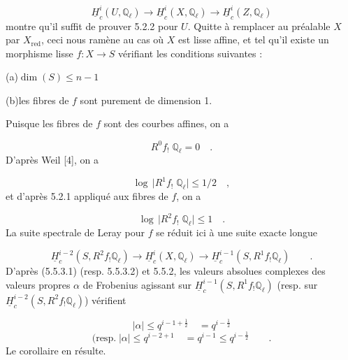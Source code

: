 \begin{equation*}
\underline{H}^i_c(U,\mathbb{Q}_\ell) \longrightarrow \underline{H}^i_c(X,\mathbb{Q}_\ell) \longrightarrow \underline{H}^i_c(Z,\mathbb{Q}_\ell)
\end{equation*}
montre qu'il suffit de prouver 5.2.2 pour $U$. Quitte à remplacer au préalable $X$ par $X_{\mathrm{red}}$, ceci nous ramène au cas où $X$ est lisse affine,
et tel qu'il existe un morphisme lisse $f : X \longrightarrow S$ vérifiant les conditions suivantes :

(a)\quad $\dim(S) \leq n-1$

(b)\quad les fibres de $f$ sont purement de dimension 1.

Puisque les fibres de $f$ sont des courbes affines, on a

\begin{equation*}
R^0 f_! \; \mathbb{Q}_\ell = 0 \quad .
\end{equation*}
D'après Weil [4], on a

\begin{equation}\tag{5.5.3.1}
\log \, \bigl| R^1 f_! \; \mathbb{Q}_\ell \bigr| \leq 1/2 \quad ,
\end{equation}
et d'après 5.2.1 appliqué aux fibres de $f$, on a

\begin{equation}\tag{5.5.3.2}
\log \, \bigl| R^2 f_! \; \mathbb{Q}_\ell \bigr| \leq 1 \quad .
\end{equation}
La suite spectrale de Leray pour $f$ se réduit ici à une suite exacte longue

\begin{equation*}
\underline{H}^{i-2}_c(S,R^2 f_! \mathbb{Q}_\ell) \longrightarrow \underline{H}^i_c(X,\mathbb{Q}_\ell) \longrightarrow \underline{H}^{i-1}_c(S,R^1 f_! \mathbb{Q}_\ell) \qquad .
\end{equation*}
D'après (5.5.3.1) (resp. 5.5.3.2) et 5.5.2, les valeurs absolues complexes des valeurs propres $\alpha$ de Frobenius agissant sur $\underline{H}^{i-1}_c(S,R^1 f_! \mathbb{Q}_\ell)$ (resp. sur $\underline{H}^{i-2}_c(S,R^2 f_! \mathbb{Q}_\ell)$) vérifient

\begin{equation*}
|\alpha| \leq q^{i-1+\frac{1}{2}} \quad = q^{i-\frac{1}{2}}
\end{equation*}
\begin{equation*}
(\mathrm{resp.} \; |\alpha| \leq q^{i-2+1} \quad = q^{i-1} \leq q^{i-\frac{1}{2}} \qquad .
\end{equation*}
Le corollaire en résulte.


